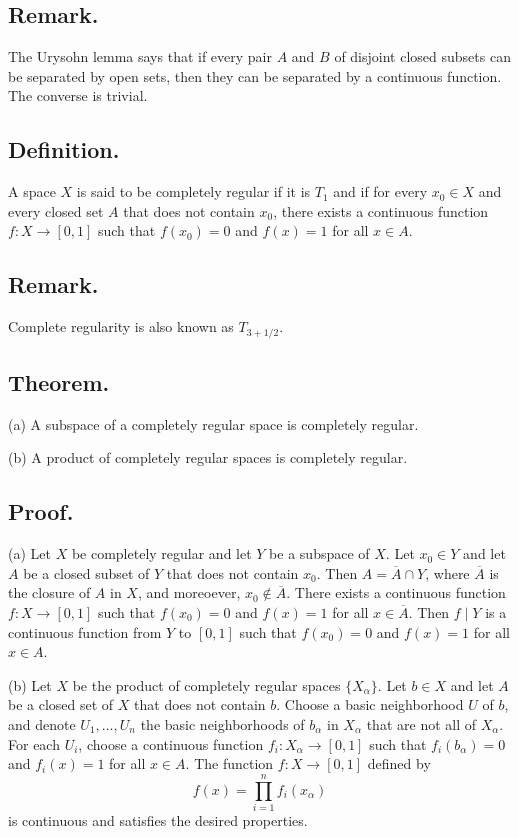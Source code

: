 \documentclass[titlepage]{article}
\begin{document}
\subsection{Remark.} The Urysohn lemma says that if every pair $A$ and $B$ of disjoint closed subsets can be separated by open sets, then they can be separated by a continuous function. The converse is trivial.

\subsection{Definition.} A space $X$ is said to be completely regular if it is $T_{1}$ and if for every $x_{0} \in X$ and every closed set $A$ that does not contain $x_{0}$, there exists a continuous function $f: X \to [0, 1]$ such that $f(x_{0}) = 0$ and $f(x) = 1$ for all $x \in A$.

\subsection{Remark.} Complete regularity is also known as $T_{3+1/2}$.

\subsection{Theorem.}

(a) A subspace of a completely regular space is completely regular.

(b) A product of completely regular spaces is completely regular.

\subsection{Proof.}

(a) Let $X$ be completely regular and let $Y$ be a subspace of $X$. Let $x_{0} \in Y$ and let $A$ be a closed subset of $Y$ that does not contain $x_{0}$. Then $A = \overline{A} \cap Y$, where $\overline{A}$ is the closure of $A$ in $X$, and moreoever, $x_{0} \not\in \overline{A}$. There exists a continuous function $f: X \to [0, 1]$ such that $f(x_{0}) = 0$ and $f(x) = 1$ for all $x \in \overline{A}$. Then $f \mid Y$ is a continuous function from $Y$ to $[0, 1]$ such that $f(x_{0}) = 0$ and $f(x) = 1$ for all $x \in A$.

(b) Let $X$ be the product of completely regular spaces $\{X_{\alpha}\}$. Let $b \in X$ and let $A$ be a closed set of $X$ that does not contain $b$. Choose a basic neighborhood $U$ of $b$, and denote $U_{1}, \ldots, U_{n}$ the basic neighborhoods of $b_{\alpha}$ in $X_{\alpha}$ that are not all of $X_{\alpha}$. For each $U_{i}$, choose a continuous function $f_{i}: X_{\alpha} \to [0, 1]$ such that $f_{i}(b_{\alpha}) = 0$ and $f_{i}(x) = 1$ for all $x \in A$. The function $f: X \to [0, 1]$ defined by 
$$f(x) = \prod_{i=1}^{n} f_{i}(x_{\alpha})$$
is continuous and satisfies the desired properties.
\end{document}
